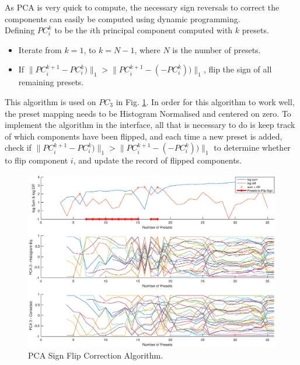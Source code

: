 \documentclass[11pt, oneside]{report}   	%
\begin{document}
As PCA is very quick to compute, the necessary sign reversals to correct the components can easily be computed using dynamic programming.\\ Defining $PC_i^k$ to be the $i$th principal component computed with $k$ presets.
\begin{itemize}
		\setlength\itemsep{-1.2em}
	\item 
Iterate from $k = 1$, to $k = N-1$, where $N$ is the number of presets.
	\item 
If $\|PC_i^{k+1} - PC_i^k)\|_1 > \|PC_i^{k+1} - (-PC_i^k))\|_1$,  flip the sign of all remaining presets.
\end{itemize}
This algorithm is used on $PC_3$ in Fig. \ref{fig:PCAnumPresets2}. In order for this algorithm to work well, the preset mapping needs to be Histogram Normalised and centered on zero. To implement the algorithm in the interface, all that is necessary to do is keep track of which components have been flipped, and each time a new preset is added, check if $\|PC_i^{k+1} - PC_i^k)\|_1 > \|PC_i^{k+1} - (-PC_i^k))\|_1$ to determine whether to flip component $i$, and update the record of flipped components. 

\begin{figure}
	\hspace{-40pt}
	\includegraphics[trim={0, 1cm, 0, 1.5cm}, clip, width = 7in]{PCAnumPresets2.eps}
	\caption{PCA Sign Flip Correction Algorithm.}
	\label{fig:PCAnumPresets2}
	\vspace{-10pt}
\end{figure}
\end{document}
